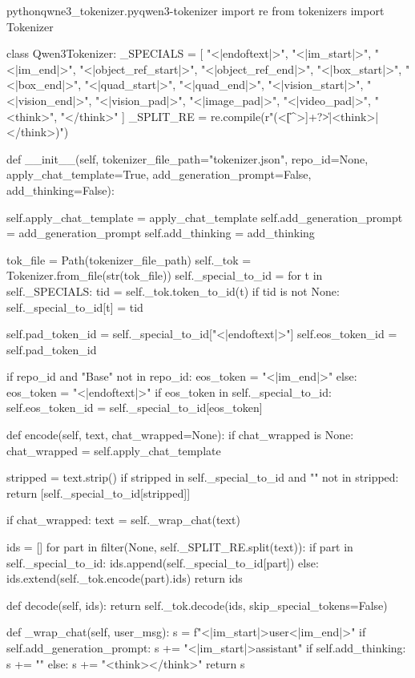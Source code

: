 \documentclass[lang=cn,newtx,10pt,scheme=chinese]{elegantbook}
\begin{document}
\begin{codebox}{python}{qwne3\_tokenizer.py}{qwen3-tokenizer}
import re
from tokenizers import Tokenizer

class Qwen3Tokenizer:
    _SPECIALS = [
        "<|endoftext|>",
        "<|im_start|>", "<|im_end|>",
        "<|object_ref_start|>", "<|object_ref_end|>",
        "<|box_start|>", "<|box_end|>",
        "<|quad_start|>", "<|quad_end|>",
        "<|vision_start|>", "<|vision_end|>",
        "<|vision_pad|>", "<|image_pad|>", "<|video_pad|>",
        "<think>", "</think>"
    ]
    _SPLIT_RE = re.compile(r"(<\|[^>]+?\|>|<think>|</think>)")

    def __init__(self, tokenizer_file_path="tokenizer.json", repo_id=None,
                 apply_chat_template=True, add_generation_prompt=False, add_thinking=False):

        self.apply_chat_template = apply_chat_template
        self.add_generation_prompt = add_generation_prompt
        self.add_thinking = add_thinking

        tok_file = Path(tokenizer_file_path)
        self._tok = Tokenizer.from_file(str(tok_file))
        self._special_to_id = {}
        for t in self._SPECIALS:
            tid = self._tok.token_to_id(t)
            if tid is not None:
                self._special_to_id[t] = tid

        self.pad_token_id = self._special_to_id["<|endoftext|>"]
        self.eos_token_id = self.pad_token_id

        if repo_id and "Base" not in repo_id:
            eos_token = "<|im_end|>"
        else:
            eos_token = "<|endoftext|>"
        if eos_token in self._special_to_id:
            self.eos_token_id = self._special_to_id[eos_token]

    def encode(self, text, chat_wrapped=None):
        if chat_wrapped is None:
            chat_wrapped = self.apply_chat_template

        stripped = text.strip()
        if stripped in self._special_to_id and "\n" not in stripped:
            return [self._special_to_id[stripped]]

        if chat_wrapped:
            text = self._wrap_chat(text)

        ids = []
        for part in filter(None, self._SPLIT_RE.split(text)):
            if part in self._special_to_id:
                ids.append(self._special_to_id[part])
            else:
                ids.extend(self._tok.encode(part).ids)
        return ids

    def decode(self, ids):
        return self._tok.decode(ids, skip_special_tokens=False)

    def _wrap_chat(self, user_msg):
        s = f"<|im_start|>user<|im_end|>\n"
        if self.add_generation_prompt:
            s += "<|im_start|>assistant"
            if self.add_thinking:
                s += "\n"
            else:
                s += "\n<think>\n\n</think>\n\n"
        return s
\end{codebox}
\end{document}
